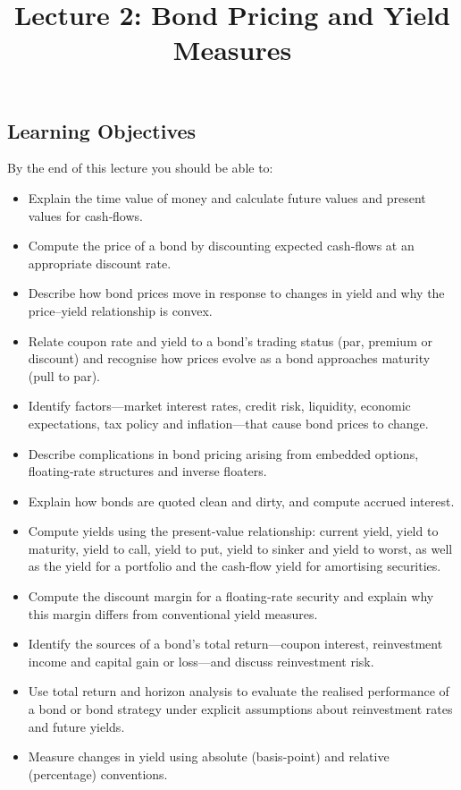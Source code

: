 \documentclass[
  letterpaper,
  DIV=11,
  numbers=noendperiod]{scrartcl}
\title{Lecture 2: Bond Pricing and Yield Measures}
\author{}
\date{}
\providecommand{\tightlist}{%
  \setlength{\itemsep}{0pt}\setlength{\parskip}{0pt}}
\renewcommand*\contentsname{Table of contents}
\newcommand\contentsname{Table of contents}
\begin{document}
\maketitle

\renewcommand*\contentsname{Table of contents}
{
\hypersetup{linkcolor=}
\setcounter{tocdepth}{3}
\tableofcontents
}

\subsection{Learning Objectives}\label{learning-objectives}

By the end of this lecture you should be able to:

\begin{itemize}
\tightlist
\item
  Explain the time value of money and calculate future values and
  present values for cash‑flows.
\item
  Compute the price of a bond by discounting expected cash‑flows at an
  appropriate discount rate.
\item
  Describe how bond prices move in response to changes in yield and why
  the price--yield relationship is convex.
\item
  Relate coupon rate and yield to a bond's trading status (par, premium
  or discount) and recognise how prices evolve as a bond approaches
  maturity (pull to par).
\item
  Identify factors---market interest rates, credit risk, liquidity,
  economic expectations, tax policy and inflation---that cause bond
  prices to change.
\item
  Describe complications in bond pricing arising from embedded options,
  floating‑rate structures and inverse floaters.
\item
  Explain how bonds are quoted clean and dirty, and compute accrued
  interest.
\item
  Compute yields using the present‑value relationship: current yield,
  yield to maturity, yield to call, yield to put, yield to sinker and
  yield to worst, as well as the yield for a portfolio and the cash‑flow
  yield for amortising securities.
\item
  Compute the discount margin for a floating‑rate security and explain
  why this margin differs from conventional yield measures.
\item
  Identify the sources of a bond's total return---coupon interest,
  reinvestment income and capital gain or loss---and discuss
  reinvestment risk.
\item
  Use total return and horizon analysis to evaluate the realised
  performance of a bond or bond strategy under explicit assumptions
  about reinvestment rates and future yields.
\item
  Measure changes in yield using absolute (basis‑point) and relative
  (percentage) conventions.
\end{itemize}
\end{document}
